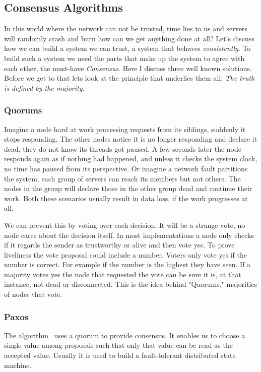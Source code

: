 \subsection{Consensus Algorithms}
In this world where the network can not be trusted, time lies to us and servers will randomly crash and burn how can we get anything done at all? Let's discuss how we can build a system we can trust, a system that behaves \textit{consistently}. To build such a system we need the parts that make up the system to agree with each other, the must-have \emph{Consensus}. Here I discuss three well known solutions. Before we get to that lets look at the principle that underlies them all: \emph{The truth is defined by the majority}.

\subsubsection*{Quorums}
Imagine a node hard at work processing requests from its siblings, suddenly it stops responding. The other nodes notice it is no longer responding and declare it dead, they do not know its threads got paused. A few seconds later the node responds again as if nothing had happened, and unless it checks the system clock, no time has paused from its perspective. Or imagine a network fault partitions the system, each group of servers can reach its members but not others. The nodes in the group will declare those in the other group dead and continue their work. Both these scenarios usually result in data loss, if the work progresses at all.

We can prevent this by voting over each decision. It will be a strange vote, no node cares about the decision itself. In most implementations a node only checks if it regards the sender as trustworthy or alive and then vote yes. To prove liveliness the vote proposal could include a number. Voters only vote yes if the number is correct. For example if the number is the highest they have seen. If a majority votes yes the node that requested the vote can be sure it is, at that instance, not dead or disconnected. This is the idea behind "Quorums," majorities of nodes that vote.

\subsubsection*{Paxos}
The \paxos{} algorithm~\cite{paxos} uses a quorum to provide consensus. It enables us to choose a single value among proposals such that only that value can be read as the accepted value. Usually it is used to build a fault-tolerant distributed state machine. 

